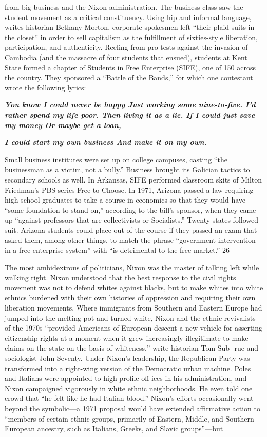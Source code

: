 from big business and the Nixon administration. The business class saw the student movement as a critical constituency. Using hip and informal language, writes historian Bethany Morton, corporate spokesmen left “their plaid suits in the closet” in order to sell capitalism as the fulfillment of sixties-style liberation, participation, and authenticity. Reeling from pro-tests against the invasion of Cambodia (and the massacre of four students that ensued), students at Kent State formed a chapter of Students in Free Enterprise (SIFE), one of {\color{blue} 150 } across the country. They sponsored a “Battle of the Bands,” for which one contestant wrote the following lyrics:{\par} {\textbf{\textit{You know I could never be happy Just working some nine-to-five. I’d rather spend my life poor. Then living it as a lie. If I could just save my money Or maybe get a loan,} } }{\par} {\par} {\textbf{\textit{I could start my own business And make it on my own.} } }{\par} Small business institutes were set up on college campuses, casting “the businessman as a victim, not a bully.” Business brought its Galician tactics to secondary schools as well. In Arkansas, SIFE performed classroom skits of Milton Friedman’s PBS series Free to Choose. In 1971, Arizona passed a law requiring high school graduates to take a course in economics so that they would have “some foundation to stand on,” according to the bill’s sponsor, when they came up “against professors that are collectivists or Socialists.” Twenty states followed suit. Arizona students could place out of the course if they passed an exam that asked them, among other things, to match the phrase “government intervention in a free enterprise system” with “is detrimental to the free market.” {\color{blue} 26 } {\par} The most ambidextrous of politicians, Nixon was the master of talking left while walking right. Nixon understood that the best response to the civil rights movement was not to defend whites against blacks, but to make whites into white ethnics burdened with their own histories of oppression and requiring their own liberation movements. Where immigrants from Southern and Eastern Europe had jumped into the melting pot and turned white, Nixon and the ethnic revivalists of the 1970s “provided Americans of European descent a new vehicle for asserting citizenship rights at a moment when it grew increasingly illegitimate to make claims on the state on the basis of whiteness,” write historian Tom Sub- rue and sociologist John Seventy. Under Nixon’s leadership, the Republican Party was transformed into a right-wing version of the Democratic urban machine. Poles and Italians were appointed to high-profile off ices in his administration, and Nixon campaigned vigorously in white ethnic neighborhoods. He even told one crowd that “he felt like he had Italian blood.” Nixon’s efforts occasionally went beyond the symbolic—a 1971 proposal would have extended affirmative action to “members of certain ethnic groups, primarily of Eastern, Middle, and Southern European ancestry, such as Italians, Greeks, and Slavic groups”—but 